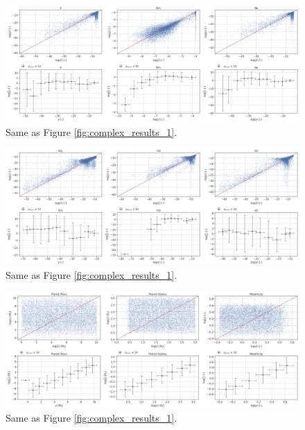 \begin{figure} [!htb]
    \centering
    \includegraphics[width=\textwidth,keepaspectratio]{figuren/results4.png}
    \caption{Same as Figure \ref{fig:complex_results_1}.}
    \label{fig:complex_results_4}
\end{figure}

\begin{figure} [!htb]
    \centering
    \includegraphics[width=\textwidth,keepaspectratio]{figuren/results5.png}
    \caption{Same as Figure \ref{fig:complex_results_1}.}
    \label{fig:complex_results_5}
\end{figure}

\begin{figure} [!htb]
    \centering
    \includegraphics[width=\textwidth,keepaspectratio]{figuren/results6.png}
    \caption{Same as Figure \ref{fig:complex_results_1}.}
    \label{fig:complex_results_6}
\end{figure}

